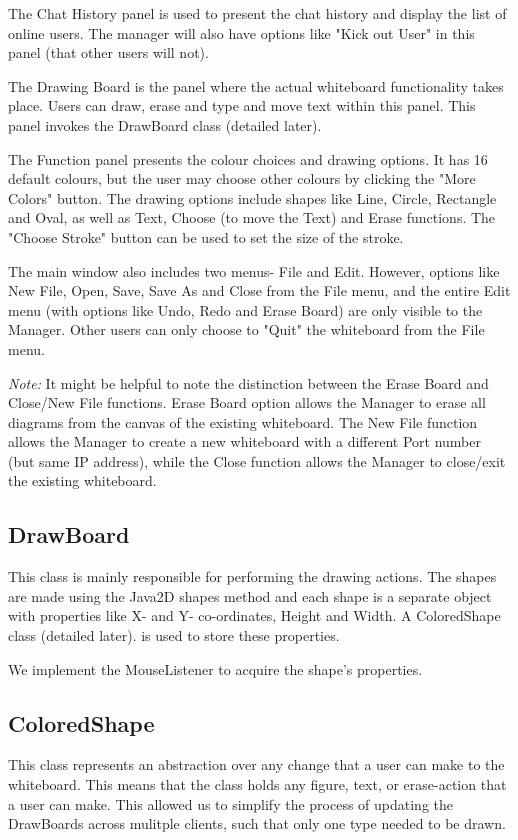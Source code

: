 \noindent The Chat History panel is used to present the chat history and display the list of online users. The manager will also have options like "Kick out User" in this panel (that other users will not).

\noindent The Drawing Board is the panel where the actual whiteboard functionality takes place. Users can draw, erase and type and move text within this panel. This panel invokes the DrawBoard class (detailed later).

\noindent The Function panel presents the colour choices and drawing options. It has 16 default colours, but the user may choose other colours by clicking the "More Colors" button. The drawing options include shapes like Line, Circle, Rectangle and Oval, as well as Text, Choose (to move the Text) and Erase functions. The "Choose Stroke" button can be used to set the size of the stroke.

\noindent The main window also includes two menus- File and Edit. However, options like New File, Open, Save, Save As and Close from the File menu, and the entire Edit menu (with options like Undo, Redo and Erase Board) are only visible to the Manager. Other users can only choose to "Quit" the whiteboard from the File menu.

\noindent \textit{Note:} It might be helpful to note the distinction between the Erase Board and Close/New File functions. Erase Board option allows the Manager to erase all diagrams from the canvas of the existing whiteboard. The New File function allows the Manager to create a new whiteboard with a different Port number (but same IP address), while the Close function allows the Manager to close/exit the existing whiteboard.
\subsection{DrawBoard}
This class is mainly responsible for performing the drawing actions. The shapes are made using the Java2D shapes method and each shape is a separate object with properties like X- and Y- co-ordinates, Height and Width. A ColoredShape class (detailed later). is used to store these properties.

\noindent We implement the MouseListener to acquire the shape's properties.
\subsection{ColoredShape}
This class represents an abstraction over any change that a user can make to the whiteboard. This means that the class holds any figure, text, or erase-action that a user can make. This allowed us to simplify the process of updating the DrawBoards across mulitple clients, such that only one type needed to be drawn.

